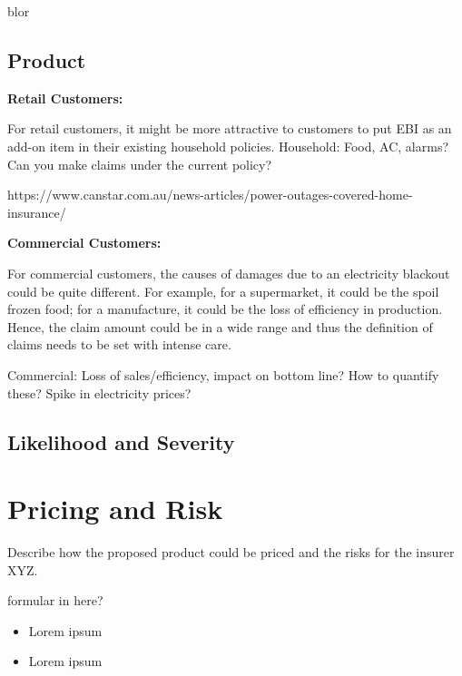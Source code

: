 \documentclass[12pt]{article}
\begin{document}
\fullboxbegin
blor
\fullboxend

\subsection{Product}
{\textbf{\large Retail Customers:}}\par
\begin{flushleft}
For retail customers, it might be more attractive to customers to put EBI as an add-on item in their existing household policies.
Household: Food, AC, alarms? Can you make claims under the current policy? \par
https://www.canstar.com.au/news-articles/power-outages-covered-home-insurance/
\end{flushleft}
{\textbf{\large Commercial Customers:}}\par
\begin{flushleft}
For commercial customers, the causes of damages due to an electricity blackout could be quite different. For example, for a supermarket,  it could be the spoil frozen food; for a manufacture, it could be the loss of efficiency in production. Hence, the claim amount could be in a wide range and thus the definition of claims needs to be set with intense care.    

Commercial: Loss of sales/efficiency, impact on bottom line? How to quantify these? Spike in electricity prices?\par
\end{flushleft}
\subsection{Likelihood and Severity}
\lipsum[1]



\section{Pricing and Risk}
Describe how the proposed product could be priced and the risks for the insurer XYZ. 

\leftboxbegin
formular in here?
\leftboxend

\lipsum[1]

\rightboxbegin
\begin{itemize}
 \item Lorem ipsum
 \item Lorem ipsum
\end{itemize}
\rightboxend
\end{document}

